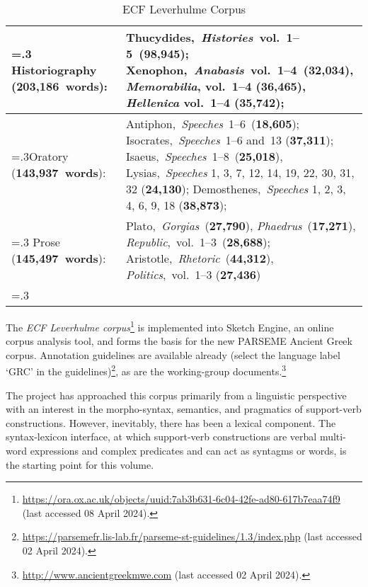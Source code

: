 \documentclass[output=paper,colorlinks,citecolor=brown]{langscibook}
\begin{document}
\begin{table}
\small
\caption{ECF Leverhulme Corpus}
\label{tab:myname:ECF}
\begin{tabularx}{\textwidth}{>{\hsize=.3\hsize}X  X}
  \lsptoprule
  Historiography (\textbf{203,186~words}):    & Thucydides,~\emph{Histories}~vol.~1--5~(\textbf{98,945}); Xenophon,~\emph{Anabasis}~vol.~1--4~(\textbf{32,034}), \emph{Memorabilia}, vol.~1--4 (\textbf{36,465}), \emph{Hellenica} vol.~1--4 (\textbf{35,742});\\
  \midrule
  Oratory (\textbf{143,937~words}):          & Antiphon,~\emph{Speeches}~1--6~(\textbf{18,605}); Isocrates,~\emph{Speeches}~1--6 and~13
(\textbf{37,311}); Isaeus,~\emph{Speeches}~1--8~(\textbf{25,018}), Lysias,~\emph{Speeches} 1, 3, 7, 12, 14,
19, 22, 30, 31, 32 (\textbf{24,130}); Demosthenes,~\emph{Speeches} 1, 2, 3, 4, 6, 9, 18 (\textbf{38,873});\\
\midrule
  Prose (\textbf{145,497~words}):    & Plato,~\emph{Gorgias}~(\textbf{27,790}), \emph{Phaedrus}~(\textbf{17,271}), \emph{Republic},~vol.~1--3~(\textbf{28,688});
Aristotle,~\emph{Rhetoric}~(\textbf{44,312}), \emph{Politics},~vol.~1--3 (\textbf{27,436})\\
  \lspbottomrule
\end{tabularx}
\end{table}


The \textit{ECF Leverhulme corpus}\footnote{\url{https://ora.ox.ac.uk/objects/uuid:7ab3b631-6c04-42fe-ad80-617b7eaa74f9} (last accessed 08 April 2024).} \citep{fendelDiscourseCohesionXenophon2023} is implemented into Sketch Engine, an online corpus analysis tool, and forms the basis for the new PARSEME Ancient Greek corpus. Annotation guidelines are available already (select the language label ‘GRC’ in the guidelines)\footnote{\url{https://parsemefr.lis-lab.fr/parseme-st-guidelines/1.3/index.php} (last accessed 02 April 2024).}, as are the working-group documents.\footnote{\url{http://www.ancientgreekmwe.com} (last accessed 02 April 2024).}


The project has approached this corpus primarily from a linguistic perspective with an interest in the morpho-syntax, semantics, and pragmatics of support-verb constructions. However, inevitably, there has been a lexical component. The syntax-lexicon interface, at which support-verb constructions are verbal multi-word expressions and complex predicates and can act as syntagms or words, is the starting point for this volume. 
\end{document}
